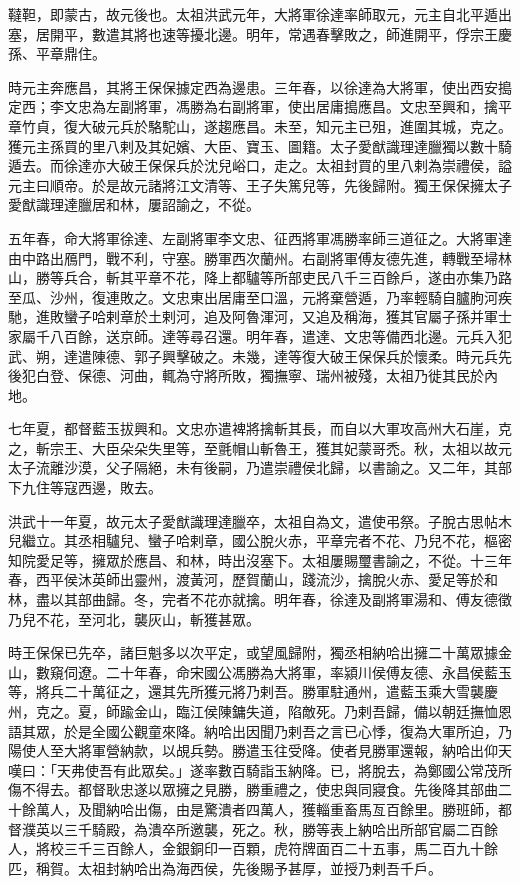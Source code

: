 
\begin{pinyinscope}
韃靼，即蒙古，故元後也。太祖洪武元年，大將軍徐達率師取元，元主自北平遁出塞，居開平，數遣其將也速等擾北邊。明年，常遇春擊敗之，師進開平，俘宗王慶孫、平章鼎住。

時元主奔應昌，其將王保保據定西為邊患。三年春，以徐達為大將軍，使出西安搗定西；李文忠為左副將軍，馮勝為右副將軍，使出居庸搗應昌。文忠至興和，擒平章竹貞，復大破元兵於駱駝山，遂趨應昌。未至，知元主已殂，進圍其城，克之。獲元主孫買的里八剌及其妃嬪、大臣、寶玉、圖籍。太子愛猷識理達臘獨以數十騎遁去。而徐達亦大破王保保兵於沈兒峪口，走之。太祖封買的里八剌為崇禮侯，謚元主曰順帝。於是故元諸將江文清等、王子失篤兒等，先後歸附。獨王保保擁太子愛猷識理達臘居和林，屢詔諭之，不從。

五年春，命大將軍徐達、左副將軍李文忠、征西將軍馮勝率師三道征之。大將軍達由中路出鴈門，戰不利，守塞。勝軍西次蘭州。右副將軍傅友德先進，轉戰至埽林山，勝等兵合，斬其平章不花，降上都驢等所部吏民八千三百餘戶，遂由亦集乃路至瓜、沙州，復連敗之。文忠東出居庸至口溫，元將棄營遁，乃率輕騎自臚朐河疾馳，進敗蠻子哈剌章於土剌河，追及阿魯渾河，又追及稱海，獲其官屬子孫并軍士家屬千八百餘，送京師。達等尋召還。明年春，遣達、文忠等備西北邊。元兵入犯武、朔，達遣陳德、郭子興擊破之。未幾，達等復大破王保保兵於懷柔。時元兵先後犯白登、保德、河曲，輒為守將所敗，獨撫寧、瑞州被殘，太祖乃徙其民於內地。

七年夏，都督藍玉拔興和。文忠亦遣裨將擒斬其長，而自以大軍攻高州大石崖，克之，斬宗王、大臣朵朵失里等，至氈帽山斬魯王，獲其妃蒙哥禿。秋，太祖以故元太子流離沙漠，父子隔絕，未有後嗣，乃遣崇禮侯北歸，以書諭之。又二年，其部下九住等寇西邊，敗去。

洪武十一年夏，故元太子愛猷識理達臘卒，太祖自為文，遣使弔祭。子脫古思帖木兒繼立。其丞相驢兒、蠻子哈剌章，國公脫火赤，平章完者不花、乃兒不花，樞密知院愛足等，擁眾於應昌、和林，時出沒塞下。太祖屢賜璽書諭之，不從。十三年春，西平侯沐英師出靈州，渡黃河，歷賀蘭山，踐流沙，擒脫火赤、愛足等於和林，盡以其部曲歸。冬，完者不花亦就擒。明年春，徐達及副將軍湯和、傅友德徵乃兒不花，至河北，襲灰山，斬獲甚眾。

時王保保已先卒，諸巨魁多以次平定，或望風歸附，獨丞相納哈出擁二十萬眾據金山，數窺伺遼。二十年春，命宋國公馮勝為大將軍，率潁川侯傅友德、永昌侯藍玉等，將兵二十萬征之，還其先所獲元將乃剌吾。勝軍駐通州，遣藍玉乘大雪襲慶州，克之。夏，師踰金山，臨江侯陳鏞失道，陷敵死。乃剌吾歸，備以朝廷撫恤恩語其眾，於是全國公觀童來降。納哈出因聞乃剌吾之言已心悸，復為大軍所迫，乃陽使人至大將軍營納款，以覘兵勢。勝遣玉往受降。使者見勝軍還報，納哈出仰天嘆曰：「天弗使吾有此眾矣。」遂率數百騎詣玉納降。已，將脫去，為鄭國公常茂所傷不得去。都督耿忠遂以眾擁之見勝，勝重禮之，使忠與同寢食。先後降其部曲二十餘萬人，及聞納哈出傷，由是驚潰者四萬人，獲輜重畜馬亙百餘里。勝班師，都督濮英以三千騎殿，為潰卒所邀襲，死之。秋，勝等表上納哈出所部官屬二百餘人，將校三千三百餘人，金銀銅印一百顆，虎符牌面百二十五事，馬二百九十餘匹，稱賀。太祖封納哈出為海西侯，先後賜予甚厚，並授乃剌吾千戶。


\end{pinyinscope}
